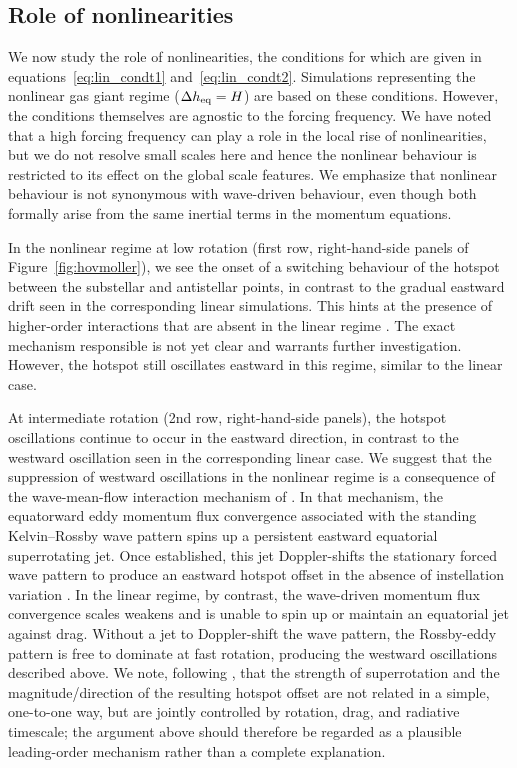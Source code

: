 \documentclass[trackchanges,twocolumn]{aastex7}
\begin{document}
\subsection{Role of nonlinearities}
\label{sec:role_of_nonlinearities}

We now study the role of nonlinearities, the conditions for which are given in equations~\eqref{eq:lin_condt1} and~\eqref{eq:lin_condt2}. Simulations representing the nonlinear gas giant regime ($\Delta h_{\rm eq} = H$) are based on these conditions. However, the conditions themselves are agnostic to the forcing frequency. We have noted that a high forcing frequency can play a role in the local rise of nonlinearities, but we do not resolve small scales here and hence the nonlinear behaviour is restricted to its effect on the global scale features. We emphasize that nonlinear behaviour is not synonymous with wave-driven behaviour, even though both formally arise from the same inertial terms in the momentum equations.

In the nonlinear regime at low rotation (first row, right-hand-side panels of Figure~\ref{fig:hovmoller}), we see the onset of a switching behaviour of the hotspot between the substellar and antistellar points, in contrast to the gradual eastward drift seen in the corresponding linear simulations. This hints at the presence of higher-order interactions that are absent in the linear regime \citep{ShowmanPolvani2010,ShowmanPolvani2011}. The exact mechanism responsible is not yet clear and warrants further investigation. However, the hotspot still oscillates eastward in this regime, similar to the linear case.

At intermediate rotation (2nd row, right-hand-side panels), the hotspot oscillations continue to occur in the eastward direction, in contrast to the westward oscillation seen in the corresponding linear case. We suggest that the suppression of westward oscillations in the nonlinear regime is a consequence of the wave-mean-flow interaction mechanism of \citet{ShowmanPolvani2010,ShowmanPolvani2011}. In that mechanism, the equatorward eddy momentum flux convergence associated with the standing Kelvin--Rossby wave pattern spins up a persistent eastward equatorial superrotating jet. Once established, this jet Doppler-shifts the stationary forced wave pattern to produce an eastward hotspot offset in the absence of instellation variation \citep{HammondPierrehumbert2018}. In the linear regime, by contrast, the wave-driven momentum flux convergence scales weakens and is unable to spin up or maintain an equatorial jet against drag. Without a jet to Doppler-shift the wave pattern, the Rossby-eddy pattern is free to dominate at fast rotation, producing the westward oscillations described above. We note, following \citet{Nicolas2026}, that the strength of superrotation and the magnitude/direction of the resulting hotspot offset are not related in a simple, one-to-one way, but are jointly controlled by rotation, drag, and radiative timescale; the argument above should therefore be regarded as a plausible leading-order mechanism rather than a complete explanation.
\end{document}
